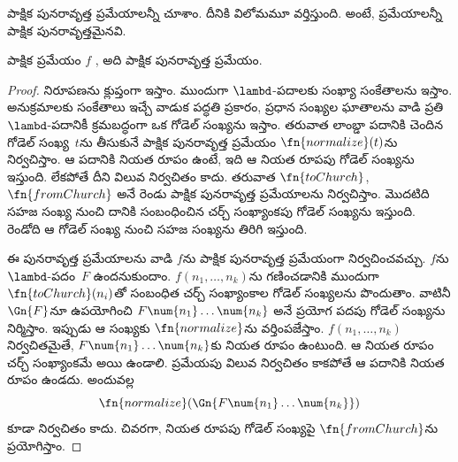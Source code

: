 \documentclass[../../../include/open-logic-section]{subfiles}
\begin{document}
\label{lam:dfl:ldr:sec}

పాక్షిక పునరావృత్త ప్రమేయాలన్నీ
 చూశాం.
దీనికి విలోమమూ వర్తిస్తుంది. అంటే,
ప్రమేయాలన్నీ పాక్షిక పునరావృత్తమైనవి.

\begin{thm}
  \label{lam:dfl:ldr:thm:lambda-computable} పాక్షిక ప్రమేయం $f$
  ,
  అది పాక్షిక పునరావృత్త ప్రమేయం.
\end{thm}

\begin{proof}
  నిరూపణను క్లుప్తంగా ఇస్తాం. ముందుగా $\lambd$-పదాలకు
  సంఖ్యా సంకేతాలను ఇస్తాం. అనుక్రమాలకు సంకేతాలు ఇచ్చే వాడుక పద్ధతి ప్రకారం,
  ప్రధాన సంఖ్యల ఘాతాలను వాడి ప్రతి $\lambd$-పదానికీ
  క్రమబద్ధంగా ఒక గోడెల్ సంఖ్యను ఇస్తాం. తరువాత లాంబ్డా పదానికి చెందిన గోడెల్ సంఖ్య~$t$ను
  తీసుకునే పాక్షిక పునరావృత్త ప్రమేయం $\fn{normalize}(t)$ను
  నిర్వచిస్తాం. ఆ పదానికి నియత రూపం ఉంటే, ఇది ఆ నియత రూపపు
  గోడెల్ సంఖ్యను ఇస్తుంది. లేకపోతే దీని విలువ నిర్వచితం కాదు.
  తరువాత $\fn{toChurch}$, $\fn{fromChurch}$ అనే రెండు పాక్షిక
  పునరావృత్త ప్రమేయాలను నిర్వచిస్తాం. మొదటిది సహజ సంఖ్య నుంచి
  దానికి సంబంధించిన చర్చ్ సంఖ్యాంకపు గోడెల్ సంఖ్యను ఇస్తుంది. రెండోది ఆ గోడెల్
  సంఖ్య నుంచి సహజ సంఖ్యను తిరిగి ఇస్తుంది.

  ఈ పునరావృత్త ప్రమేయాలను వాడి $f$ను పాక్షిక పునరావృత్త
  ప్రమేయంగా నిర్వచించవచ్చు. $f$ను
  $\lambd$-పదం~$F$ ఉందనుకుందాం. $f(n_1,\dots,n_k)$ను
  గణించడానికి ముందుగా $\fn{toChurch}(n_i)$తో సంబంధిత
  చర్చ్ సంఖ్యాంకాల గోడెల్ సంఖ్యలను పొందుతాం. వాటినీ
  $\Gn{F}$నూ ఉపయోగించి $F \num{n_1}\dots\num{n_k}$
  అనే ప్రయోగ పదపు గోడెల్ సంఖ్యను నిర్మిస్తాం. ఇప్పుడు ఆ సంఖ్యకు
  $\fn{normalize}$ను వర్తింపజేస్తాం. $f(n_1,\dots,n_k)$
  నిర్వచితమైతే, $F \num{n_1}\dots\num{n_k}$కు నియత
  రూపం ఉంటుంది. ఆ నియత రూపం చర్చ్ సంఖ్యాంకమే అయి ఉండాలి.
  ప్రమేయపు విలువ నిర్వచితం కాకపోతే ఆ పదానికి నియత రూపం ఉండదు. అందువల్ల
  \[\fn{normalize}(\Gn{F\num{n_1}\dots\num{n_k}})\]
  కూడా నిర్వచితం కాదు. చివరగా, నియత రూపపు గోడెల్ సంఖ్యపై
  $\fn{fromChurch}$ను ప్రయోగిస్తాం.
\end{proof}
\end{document}
